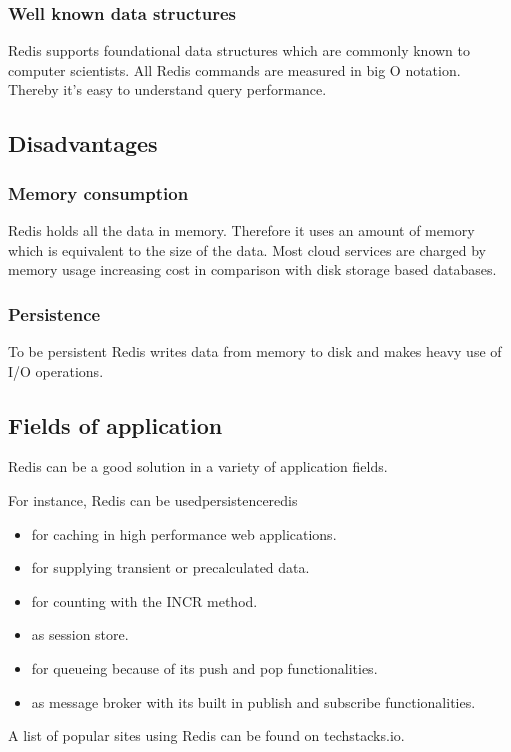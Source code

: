 \subsubsection{Well known data structures}
Redis supports foundational data structures which are commonly known to computer
scientists. All Redis commands are measured in big O notation. Thereby it’s easy
to understand query performance.

\subsection{Disadvantages}
\subsubsection{Memory consumption}
Redis holds all the data in memory. Therefore it uses an amount of memory which
is equivalent to the size of the data. Most cloud services are charged by memory
usage increasing cost in comparison with disk storage based databases.

\subsubsection{Persistence}
To be persistent Redis writes data from memory to disk and makes heavy use of
I/O operations.

\subsection{Fields of application}
Redis can be a good solution in a variety of application fields.

For instance, Redis can be usedpersistenceredis
\begin{itemize}
    \item for caching in high performance web applications.
    \item for supplying transient or precalculated data.
    \item for counting with the INCR method.
    \item as session store.
    \item for queueing because of its push and pop functionalities.
    \item as message broker with its built in publish and subscribe
    functionalities.
\end{itemize}
A list of popular sites using Redis can be found on techstacks.io.

